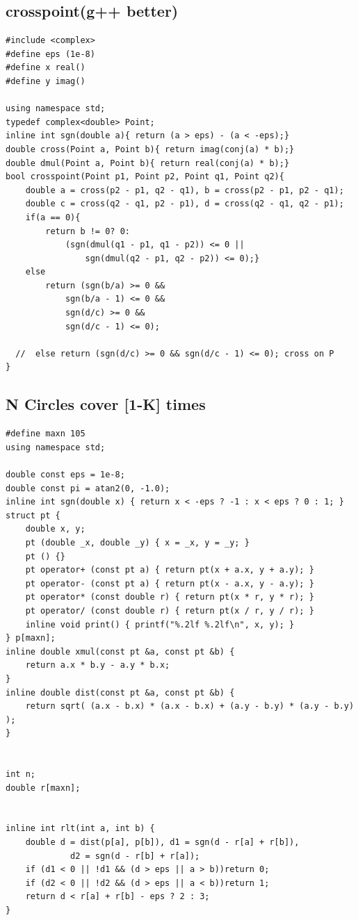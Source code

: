 \documentclass[twocolumn]{article}
\begin{document}
\begin{twocolumn}
\subsection{crosspoint(g++ better)}
\begin{lstlisting}[language={[ANSI]C}]
#include <complex>
#define eps (1e-8)
#define x real()
#define y imag()

using namespace std;
typedef complex<double> Point;
inline int sgn(double a){ return (a > eps) - (a < -eps);}
double cross(Point a, Point b){ return imag(conj(a) * b);}
double dmul(Point a, Point b){ return real(conj(a) * b);}
bool crosspoint(Point p1, Point p2, Point q1, Point q2){
    double a = cross(p2 - p1, q2 - q1), b = cross(p2 - p1, p2 - q1);
    double c = cross(q2 - q1, p2 - p1), d = cross(q2 - q1, q2 - p1);
    if(a == 0){
        return b != 0? 0:
            (sgn(dmul(q1 - p1, q1 - p2)) <= 0 ||
                sgn(dmul(q2 - p1, q2 - p2)) <= 0);}
    else
        return (sgn(b/a) >= 0 &&
            sgn(b/a - 1) <= 0 &&
            sgn(d/c) >= 0 &&
            sgn(d/c - 1) <= 0);

  //  else return (sgn(d/c) >= 0 && sgn(d/c - 1) <= 0); cross on P
}
\end{lstlisting}

\subsection{N Circles cover [1-K] times}
\begin{lstlisting}[language={[ANSI]C}]
#define maxn 105
using namespace std;

double const eps = 1e-8;
double const pi = atan2(0, -1.0);
inline int sgn(double x) { return x < -eps ? -1 : x < eps ? 0 : 1; }
struct pt {
    double x, y;
    pt (double _x, double _y) { x = _x, y = _y; }
    pt () {}
    pt operator+ (const pt a) { return pt(x + a.x, y + a.y); }
    pt operator- (const pt a) { return pt(x - a.x, y - a.y); }
    pt operator* (const double r) { return pt(x * r, y * r); }
    pt operator/ (const double r) { return pt(x / r, y / r); }
    inline void print() { printf("%.2lf %.2lf\n", x, y); }
} p[maxn];
inline double xmul(const pt &a, const pt &b) {
    return a.x * b.y - a.y * b.x;
}
inline double dist(const pt &a, const pt &b) {
    return sqrt( (a.x - b.x) * (a.x - b.x) + (a.y - b.y) * (a.y - b.y) );
}


int n;
double r[maxn];


inline int rlt(int a, int b) {
	double d = dist(p[a], p[b]), d1 = sgn(d - r[a] + r[b]),
             d2 = sgn(d - r[b] + r[a]);
	if (d1 < 0 || !d1 && (d > eps || a > b))return 0;
	if (d2 < 0 || !d2 && (d > eps || a < b))return 1;
	return d < r[a] + r[b] - eps ? 2 : 3;
}


\end{lstlisting}
\end{twocolumn}
\end{document}
